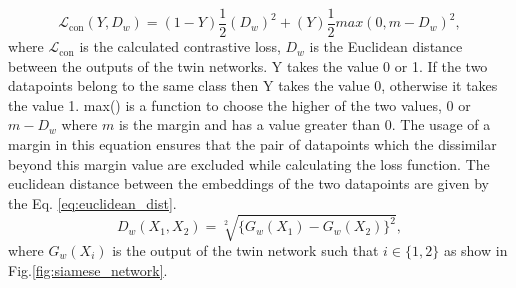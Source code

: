 \begin{equation}
  \label{eq:contrastive_loss}
  \mathcal{L}_{\textrm{con}}(Y,D_{w})= (1-Y)\frac{1}{2}(D_{w})^2 + (Y)\frac{1}{2}{max(0,m-D_{w})}^2,
\end{equation}
where $\mathcal{L}_{\textrm{con}}$ is the calculated contrastive loss, $D_{w}$ is the Euclidean distance between the outputs of the twin networks\cite{siamese_network}. Y takes the value 0 or 1. If the two datapoints belong to the same class then Y takes the value 0, otherwise it takes the value 1\cite{siamese_network}. max() is a function to choose the higher of the two values, 0 or $m-D_{w}$ where $m$ is the margin and has a value greater than 0\cite{siamese_network}. The usage of a margin in this equation ensures that the pair of datapoints which the dissimilar beyond this margin value are excluded while calculating the loss function\cite{siamese_network}. The euclidean distance between the embeddings of the two datapoints are given by the Eq. \ref{eq:euclidean_dist}.\cite{siamese_network, koch2015siamese}
\begin{equation}
  \label{eq:euclidean_dist}
  D_{w}(X_{1},X_{2})= \sqrt[2]{\{G_{w}(X_{1}) - G_{w}(X_{2})\}^2},
\end{equation}
where $G_{w}(X_{i})$ is the output of the twin network such that $i \in \{1,2\}$ as show in Fig.\ref{fig:siamese_network}.
